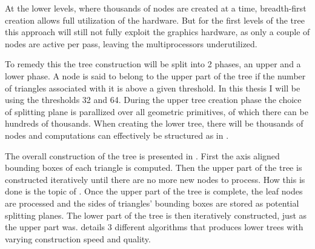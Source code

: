 
At the lower levels, where thousands of nodes are created at a time,
breadth-first creation allows full utilization of the hardware. But
for the first levels of the tree this approach will still not fully
exploit the graphics hardware, as only a couple of nodes are active
per pass, leaving the multiprocessors underutilized.

To remedy this the tree construction will be split into 2 phases, an
upper and a lower phase. A node is said to belong to the upper part of
the tree if the number of triangles associated with it is above a
given threshold. In this thesis I will be using the thresholds 32 and
64. During the upper tree creation phase the choice of splitting plane
is parallized over all geometric primitives, of which there can be
hundreds of thousands. When creating the lower tree, there will be
thousands of nodes and computations can effectively be structured as
in .


The overall construction of the tree is presented in
. First the axis aligned bounding boxes of
each triangle is computed. Then the upper part of the tree is
constructed iteratively until there are no more new nodes to
process. How this is done is the topic of
. Once the upper part of the tree is
complete, the leaf nodes are processed and the sides of triangles'
bounding boxes are stored as potential splitting planes. The lower
part of the tree is then iteratively constructed, just as the upper
part was.  details 3 different algorithms
that produces lower trees with varying construction speed and quality.

